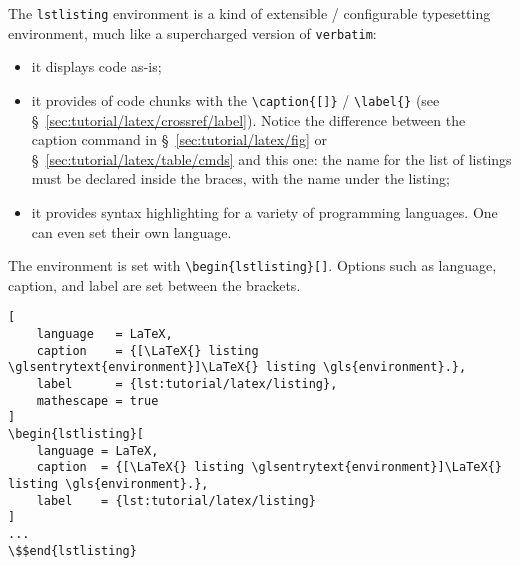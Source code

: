 The \texttt{lstlisting} \gls{environment} is a kind of extensible / configurable typesetting \gls{environment}, much like a supercharged version of \texttt{verbatim}:
\begin{itemize}
    \item it displays code as-is;
    \item it provides  of code chunks with the \texttt{\textbackslash{}caption\{[]\}} / \texttt{\textbackslash{}label\{\}} (see \S~\ref{sec:tutorial/latex/crossref/label}). Notice the difference between the caption \gls{command} in \S~\ref{sec:tutorial/latex/fig} or \S~\ref{sec:tutorial/latex/table/cmds} and this one: the name for the list of listings must be declared inside the braces, with the name under the listing;
    \item it provides syntax highlighting for a variety of programming languages. One can even set their own language.
\end{itemize}

The \gls{environment} is set with \verb"\begin{lstlisting}[]". Options such as language, caption, and \gls{label} are set between the brackets.
\bigskip

\begin{lstlisting}[
    language   = LaTeX,
    caption    = {[\LaTeX{} listing \glsentrytext{environment}]\LaTeX{} listing \gls{environment}.},
    label      = {lst:tutorial/latex/listing},
    mathescape = true
]
\begin{lstlisting}[
    language = LaTeX,
    caption  = {[\LaTeX{} listing \glsentrytext{environment}]\LaTeX{} listing \gls{environment}.},
    label    = {lst:tutorial/latex/listing}
]
...
\$$end{lstlisting}
\end{lstlisting}